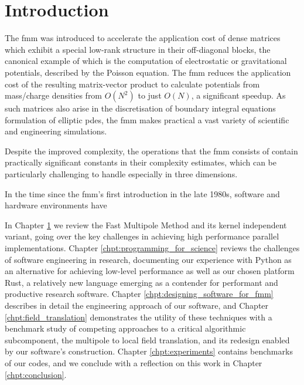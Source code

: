 \chapter{Introduction}\label{chpt:introduction}
\thispagestyle{chaptertitle} %

The \acrshort{fmm} was introduced to accelerate the application cost of dense matrices which exhibit a special low-rank structure in their off-diagonal blocks, the canonical example of which is the computation of electrostatic or gravitational potentials, described by the Poisson equation. The \acrshort{fmm} reduces the application cost of the resulting matrix-vector product to calculate potentials from mass/charge densities from $O(N^2)$ to just $O(N)$, a significant speedup. As such matrices also arise in the discretisation of boundary integral equations formulation of elliptic \acrfull{pdes}, the \acrshort{fmm} makes practical a vast variety of scientific and engineering simulations.


Despite the improved complexity, the operations that the \acrshort{fmm} consists of contain practically significant constants in their complexity estimates, which can be particularly challenging to handle especially in three dimensions.


In the time since the \acrshort{fmm}'s first introduction in the late 1980s, software and hardware environments have


In Chapter \ref{chpt:introduction} we review the Fast Multipole Method and its kernel independent variant, going over the key challenges in achieving high performance parallel implementations. Chapter \ref{chpt:programming_for_science} reviews the challenges of software engineering in research, documenting our experience with Python as an alternative for achieving low-level performance as well as our chosen platform Rust, a relatively new language emerging as a contender for performant and productive research software. Chapter \ref{chpt:designing_software_for_fmm} describes in detail the engineering approach of our software, and Chapter \ref{chpt:field_translation} demonstrates the utility of these techniques with a benchmark study of competing approaches to a critical algorithmic subcomponent, the multipole to local field translation, and its redesign enabled by our software's construction. Chapter \ref{chpt:experiments} contains benchmarks of our codes, and we conclude with a reflection on this work in Chapter \ref{chpt:conclusion}.

